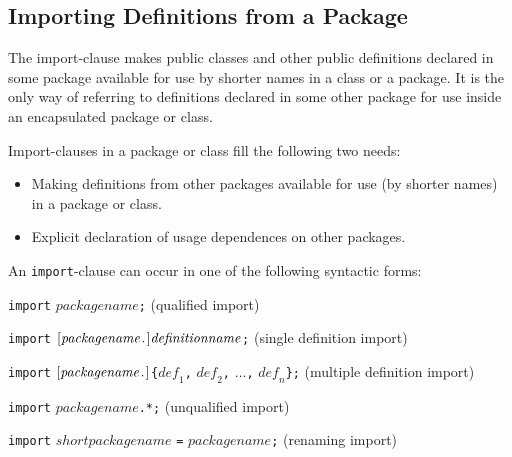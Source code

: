 \subsection{Importing Definitions from a Package}

The import-clause makes public classes and other public definitions
declared in some package available for use by shorter names in a class
or a package. It is the only way of referring to definitions declared in
some other package for use inside an encapsulated package or class.

\begin{nonnormative}
Import-clauses in a package or class fill the following two needs:
\begin{itemize}
\item
  Making definitions from other packages available for use (by shorter
  names) in a package or class.
\item
  Explicit declaration of usage dependences on other packages.
\end{itemize}
\end{nonnormative}

An \lstinline!import!-clause can occur in one of the following syntactic forms:


\lstinline!import! $\mathit{packagename}$\lstinline!;! (qualified import)

\lstinline!import! ${[}\mathit{packagename}\text{\lstinline!.!}{]}\mathit{definitionname}$\lstinline!;! (single definition import)

\lstinline!import! ${[}\mathit{packagename}\text{\lstinline!.!}{]}$\lstinline!{!$\mathit{def}_{1}$\lstinline!,! $\mathit{def}_{2}$\lstinline!,! $\ldots$\lstinline!,! $\mathit{def}_{n}$\lstinline!};! (multiple definition import)

\lstinline!import! $\mathit{packagename}$\lstinline!.*;! (unqualified import)

\lstinline!import! $\mathit{shortpackagename}$ \lstinline!=! $\mathit{packagename}$\lstinline!;! (renaming import)

